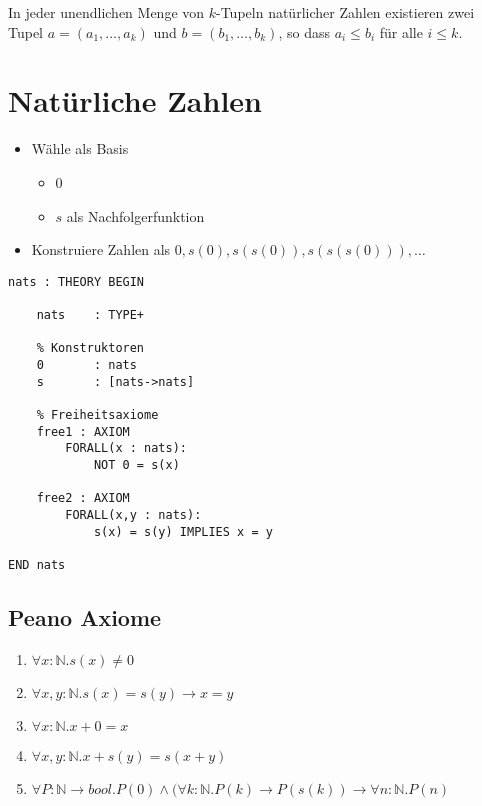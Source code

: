 \documentclass{scrartcl}
\begin{document}
In jeder unendlichen Menge von $ k $-Tupeln natürlicher Zahlen existieren zwei Tupel $ a = (a_1, \ldots, a_k) $ und $ b = (b_1, \ldots, b_k) $, so dass $ a_i \leq b_i $ für alle $ i \leq k $.

\section{Natürliche Zahlen}

\begin{itemize}
	\item Wähle als Basis
	\begin{itemize}
		\item 0
		\item $ s $ als Nachfolgerfunktion
	\end{itemize}
	\item Konstruiere Zahlen als $ 0, s(0), s(s(0)), s(s(s(0))), \ldots $
\end{itemize}

\begin{lstlisting}
nats : THEORY BEGIN

	nats	: TYPE+
	
	% Konstruktoren
	0		: nats
	s		: [nats->nats]
	
	% Freiheitsaxiome
	free1 : AXIOM
		FORALL(x : nats):
			NOT 0 = s(x)
			
	free2 : AXIOM
		FORALL(x,y : nats):
			s(x) = s(y) IMPLIES x = y

END nats
\end{lstlisting}

\subsection{Peano Axiome}

\begin{enumerate}
	\item $ \forall x : \mathbb{N} .s(x) \neq 0 $
	\item $ \forall x,y : \mathbb{N} .s(x) = s(y) \rightarrow x = y $
	\item $ \forall x : \mathbb{N} . x + 0 = x $
	\item $ \forall x,y : \mathbb{N} .x + s(y) = s(x + y) $
	\item $ \forall P : \mathbb{N} \rightarrow bool .P(0) \wedge (\forall k : \mathbb{N} .P(k) \rightarrow P(s(k)) \rightarrow \forall n : \mathbb{N} .P(n) $
\end{enumerate}
\end{document}
